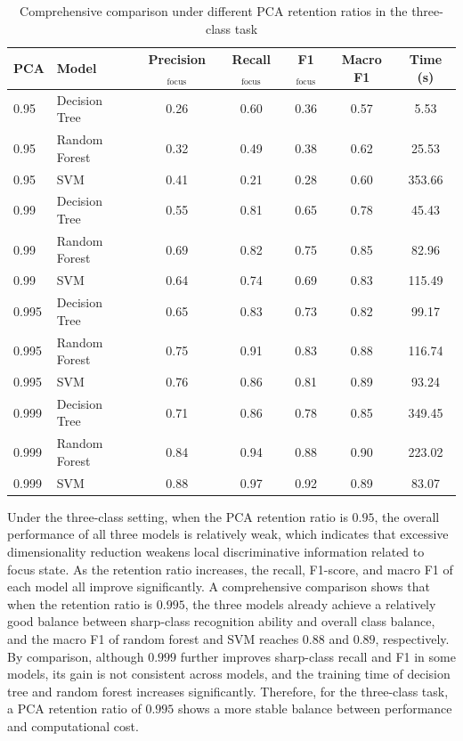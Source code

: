 \begin{table}[htbp]
    \centering
    \caption{Comprehensive comparison under different PCA retention ratios in the three-class task}
    \label{tab:pca-triclass-pca}
    \begin{tabular}{llccccc}
        \toprule
        PCA & Model & Precision$_{\mathrm{focus}}$ & Recall$_{\mathrm{focus}}$ &
        F1$_{\mathrm{focus}}$ & Macro F1 & Time (s) \\
        \midrule
        0.95  & Decision Tree & 0.26 & 0.60 & 0.36 & 0.57 & 5.53   \\
        0.95  & Random Forest & 0.32 & 0.49 & 0.38 & 0.62 & 25.53  \\
        0.95  & SVM           & 0.41 & 0.21 & 0.28 & 0.60 & 353.66 \\
        0.99  & Decision Tree & 0.55 & 0.81 & 0.65 & 0.78 & 45.43  \\
        0.99  & Random Forest & 0.69 & 0.82 & 0.75 & 0.85 & 82.96  \\
        0.99  & SVM           & 0.64 & 0.74 & 0.69 & 0.83 & 115.49 \\
        0.995 & Decision Tree & 0.65 & 0.83 & 0.73 & 0.82 & 99.17  \\
        0.995 & Random Forest & 0.75 & 0.91 & 0.83 & 0.88 & 116.74 \\
        0.995 & SVM           & 0.76 & 0.86 & 0.81 & 0.89 & 93.24  \\
        0.999 & Decision Tree & 0.71 & 0.86 & 0.78 & 0.85 & 349.45 \\
        0.999 & Random Forest & 0.84 & 0.94 & 0.88 & 0.90 & 223.02 \\
        0.999 & SVM           & 0.88 & 0.97 & 0.92 & 0.89 & 83.07  \\
        \bottomrule
    \end{tabular}
\end{table}

\par Under the three-class setting, when the PCA retention ratio is $0.95$, the
overall performance of all three models is relatively weak, which indicates
that excessive dimensionality reduction weakens local discriminative
information related to focus state. As the retention ratio increases, the
recall, F1-score, and macro F1 of each model all improve significantly. A
comprehensive comparison shows that when the retention ratio is $0.995$, the
three models already achieve a relatively good balance between sharp-class
recognition ability and overall class balance, and the macro F1 of random
forest and SVM reaches $0.88$ and $0.89$, respectively. By comparison,
although $0.999$ further improves sharp-class recall and F1 in some models,
its gain is not consistent across models, and the training time of decision
tree and random forest increases significantly. Therefore, for the three-class
task, a PCA retention ratio of $0.995$ shows a more stable balance between
performance and computational cost.

